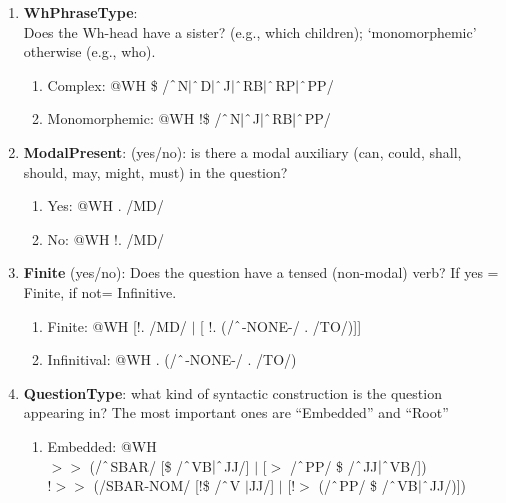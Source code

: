 \begin{enumerate}
    \item \textbf{WhPhraseType}: \\
    Does the Wh-head have a sister? (e.g., \textsf{which children}); `monomorphemic' otherwise (e.g., \textsf{who}).\\
        \begin{enumerate}  
            \item Complex: @WH \$ /$\string^$N$|\string^$D$|\string^$J$|\string^$RB$|\string^$RP$|\string^$PP/
            \item Monomorphemic: @WH !\$ /$\string^$N$|\string^$J$|\string^$RB$|\string^$PP/
        \end{enumerate}

    \item \textbf{ModalPresent}: 
    (yes/no): is there a modal auxiliary (\textsf{can}, \textsf{could}, \textsf{shall}, \textsf{should}, \textsf{may}, \textsf{might}, \textsf{must}) in the question?
        \begin{enumerate}
            \item Yes: @WH . /MD/
            \item No: @WH !. /MD/
        \end{enumerate}
    
    \item \textbf{Finite} (yes/no): Does the question have a tensed (non-modal) verb? If yes = Finite, if not= Infinitive.\\
        \begin{enumerate}
            \item Finite: @WH [!. /MD/ $|$ [ !. ($/\string^$-NONE-/ . /TO/)]]
            \item Infinitival: @WH . (/$\string^$-NONE-/ . /TO/)
        \end{enumerate}
    
    \item \textbf{QuestionType}: what kind of syntactic construction is the question appearing in? The most important ones are ``Embedded'' and ``Root''
        \begin{enumerate}
            \item Embedded: @WH \\
            $>\!\!>$ ($/\string^$SBAR/ [\$ /$\string^$VB$|\string^$JJ/] $|$ [$>$ /$\string^$PP/ \$ /$\string^$JJ$|\string^$VB/]) \\
            !$>\!\!>$ (/SBAR-NOM/ [!\$ /$\string^$V $|$JJ/] $|$ [!$>$ (/$\string^$PP/ \$ /$\string^$VB$|\string^$JJ/)])


\end{enumerate}
\end{enumerate}
